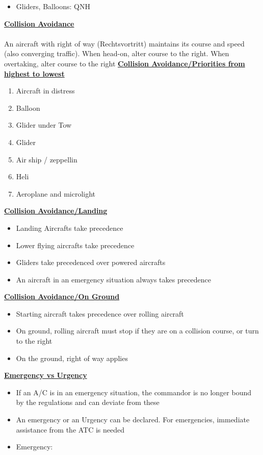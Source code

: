 \documentclass[9pt, landscape, fleqn]{scrartcl}
\begin{document}
\begin{multicols*}{3}
\begin{itemize}
    \item Gliders, Balloons: QNH 
\end{itemize}
\underline{\textbf{Collision Avoidance}} \\ \\ 
An aircraft with right of way (Rechtsvortritt) maintains its course and speed (also converging traffic). When head-on, alter course to the right. When overtaking, alter course to the right
\underline{\textbf{Collision Avoidance/Priorities from highest to lowest}}
\begin{enumerate}
    \item Aircraft in distress 
    \item Balloon 
    \item Glider under Tow
    \item Glider 
    \item Air ship / zeppellin 
    \item Heli 
    \item Aeroplane and microlight
\end{enumerate}
\underline{\textbf{Collision Avoidance/Landing}}
\begin{itemize}
    \item Landing Aircrafts take precedence 
    \item Lower flying aircrafts take precedence 
    \item Gliders take precedenced over powered aircrafts 
    \item An aircraft in an emergency situation always takes precedence
\end{itemize}
\underline{\textbf{Collision Avoidance/On Ground}}
\begin{itemize}
    \item Starting aircraft takes precedence over rolling aircraft 
    \item On ground, rolling aircraft must stop if they are on a collision course, or turn to the right 
    \item On the ground, right of way applies 
\end{itemize}
\underline{\textbf{Emergency vs Urgency}}
\begin{itemize}
    \item If an A/C is in an emergency situation, the commandor is no longer bound by the regulations and can deviate from these 
    \item An emergency or an Urgency can be declared. For emergencies, immediate assistance from the ATC is needed 
    \item Emergency:

\end{itemize}
\end{multicols*}
\end{document}
